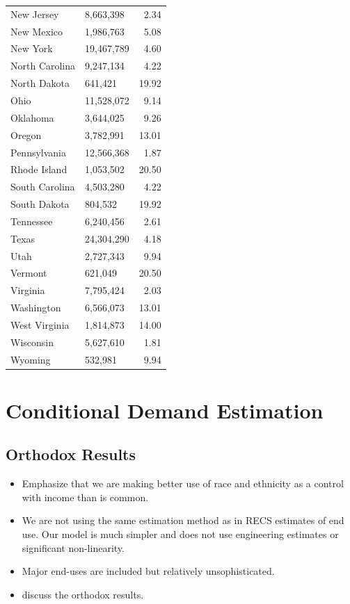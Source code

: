 \documentclass{article}
\begin{document}
\begin{table}[ht]
{\begin{tabular}{llr}
  New Jersey & 8,663,398 & 2.34 \\ 
  New Mexico & 1,986,763 & 5.08 \\ 
  New York & 19,467,789 & 4.60 \\ 
  North Carolina & 9,247,134 & 4.22 \\ 
  North Dakota & 641,421 & 19.92 \\ 
  Ohio & 11,528,072 & 9.14 \\ 
  Oklahoma & 3,644,025 & 9.26 \\ 
  Oregon & 3,782,991 & 13.01 \\ 
  Pennsylvania & 12,566,368 & 1.87 \\ 
  Rhode Island & 1,053,502 & 20.50 \\ 
  South Carolina & 4,503,280 & 4.22 \\ 
  South Dakota & 804,532 & 19.92 \\ 
  Tennessee & 6,240,456 & 2.61 \\ 
  Texas & 24,304,290 & 4.18 \\ 
  Utah & 2,727,343 & 9.94 \\ 
  Vermont & 621,049 & 20.50 \\ 
  Virginia & 7,795,424 & 2.03 \\ 
  Washington & 6,566,073 & 13.01 \\ 
  West Virginia & 1,814,873 & 14.00 \\ 
  Wisconsin & 5,627,610 & 1.81 \\ 
  Wyoming & 532,981 & 9.94 \\ 
   \hline
\end{tabular}
}
\end{table}
\section{Conditional Demand Estimation}

  \subsection{Orthodox Results}
  
  \begin{itemize}
    \item Emphasize that we are making better use of race and ethnicity as a control with income than is common.
    \item We are not using the same estimation method as in RECS estimates of end use.  Our model is much simpler and does not use engineering estimates or significant non-linearity.
    \item Major end-uses are included but relatively unsophisticated.
    \item discuss the orthodox results.
  \end{itemize}
  
\end{document}
